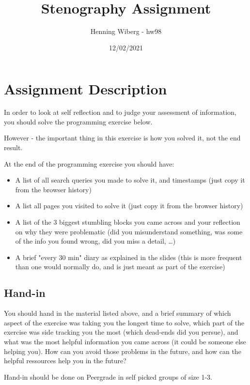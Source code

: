 \documentclass[11pt,a4paper]{article}
\begin{document}
\title{\Large{\textbf{Stenography Assignment}}}
\author{Henning Wiberg - hw98}
\date{12/02/2021}
\maketitle
\tableofcontents
\setcounter{page}{2}

\section{Assignment Description}

In order to look at self reflection and to judge your assessment of information, you should solve the programming exercise below.

However - the important thing in this exercise is how you solved it, not the end result.

At the end of the programming exercise you should have:

\begin{itemize}
	\item A list of all search queries you made to solve it, and timestamps (just copy it from the browser history)
	\item A list all pages you visited to solve it (just copy it from the browser history)
	\item A list of the 3 biggest stumbling blocks you came across and your reflection on why they were problematic (did 		you misunderstand something, was some of the info you found wrong, did you miss a detail, …)
	\item A brief "every 30 min" diary as explained in the slides (this is more frequent than one would normally do, and 		is just meant as part of the exercise)
\end{itemize}


\subsection{Hand-in}

You should hand in the material listed above, and a brief summary of which aspect of the exercise was taking you the longest time to solve, which part of the exercise was side tracking you the most (which dead-ends did you persue), and what was the most helpful information you came across (it could be someone else helping you). How can you avoid those problems in the future, and how can the helpful ressources help you in the future?

Hand-in should be done on Peergrade in self picked groups of size 1-3.
\end{document}
